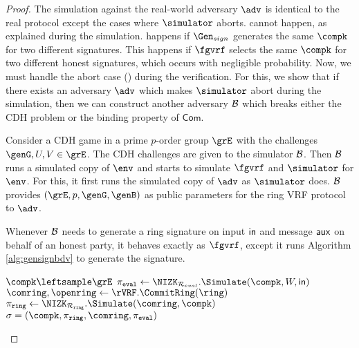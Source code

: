 \begin{proof}
	The  simulation against the real-world adversary $ \adv $ is identical to the real protocol except the cases where $ \simulator $ aborts.  cannot happen, as explained during the simulation.   happens if $ \Gen_{sign} $ generates the same $ \compk $ for two different signatures. This happens if $ \fgvrf $  selects the same $ \compk $ for two different honest signatures, which occurs with negligible probability.
	Now, we must handle the abort case () during the verification.
	For this, we show that if there exists an adversary $ \adv $ which makes $ \simulator $ abort during the simulation, then we can construct another adversary $ \mathcal{B} $ which breaks either the CDH problem or the binding property of $ \mathsf{Com}$.
	
	Consider a CDH game in a prime $ p $-order group  $ \grE $ with the challenges $ \genG,U, V \in \grE$. The CDH challenges are given to the simulator $ \mathcal{B} $. Then $ \mathcal{B} $ runs a simulated copy of $ \env $ and starts to simulate $ \fgvrf $ and $ \simulator $ for $ \env $. For this, it first runs the simulated copy of $ \adv $ as $ \simulator $ does. $ \mathcal{B} $ provides $ (\grE, p, \genG , \genB) $ as public parameters for the ring VRF protocol to $ \adv $.
	
	Whenever $ \mathcal{B} $ needs to generate a ring signature on input $ \mathsf{in} $ and message $ \mathsf{aux} $ on behalf of an honest party, it behaves exactly as $ \fgvrf $, except it runs   Algorithm \ref{alg:gensignbdv} to generate the signature. 
	
	\begin{algorithm}
		\caption{$\gen_{sign}(\ring,W,\pk,\aux,\msg)$}
		\label{alg:gensignbdv}	 	
		\begin{algorithmic}[1]
			\State $ \compk\leftsample \grE$
			\State $ \pieval \leftarrow \NIZK_{\mathcal{R}_{eval}}.\Simulate(\compk, W,\msg) $
			\State $ \comring, \openring \leftarrow \rVRF.\CommitRing(\ring) $
			\State $ \piring \leftarrow \NIZK_{\rsnark}.\Simulate(\comring, \compk) $ 
			\State\Return$ \sigma = (\compk,\piring, \comring, \pieval) $
		\end{algorithmic}
		

\end{algorithm}
\end{proof}
